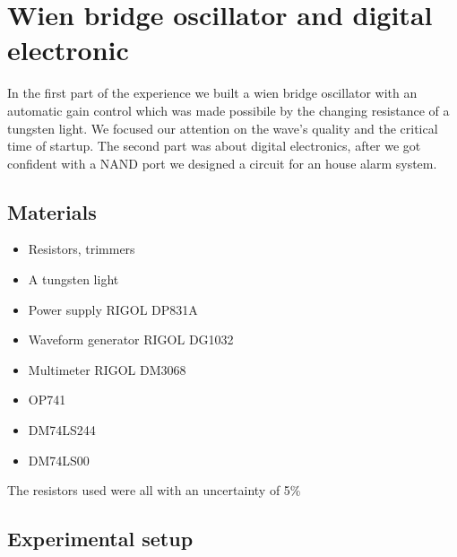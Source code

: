 \chapter{Wien bridge oscillator and digital electronic}
In the first part of the experience we built a wien bridge oscillator with an automatic gain control which was made possibile by the changing resistance of a tungsten light. We focused our attention on the wave's quality and the critical time of startup. The second part was about digital electronics, after we got confident with a NAND port we designed a circuit for an house alarm system.
\section{Materials}
\begin{itemize}
\item Resistors, trimmers
\item A tungsten light
\item Power supply RIGOL DP831A
\item Waveform generator RIGOL DG1032
\item Multimeter RIGOL DM3068
\item OP741
\item DM74LS244
\item DM74LS00
\end{itemize}
The resistors used were all with an uncertainty of 5\%

\section{Experimental setup}
